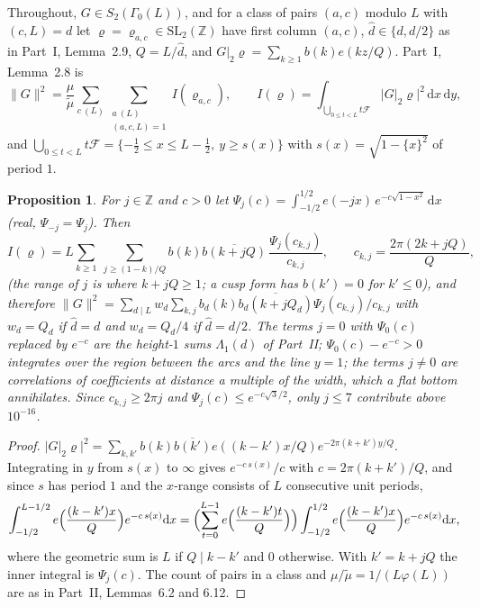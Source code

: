 \documentclass[11pt]{amsart}
\newtheorem{proposition}[theorem]{Proposition}
\theoremstyle{remark}
\newcommand{\Z}{\mathbb{Z}}
\newcommand{\dd}{\mathrm{d}}
\newcommand{\cF}{\mathcal{F}}
\begin{document}
Throughout, $G\in S_2(\Gamma_0(L))$, and for a class of pairs $(a,c)$ modulo $L$ with $(c,L)=d$ let $\varrho=\varrho_{a,c}\in\mathrm{SL}_2(\Z)$ have first column $(a,c)$, $\hat d\in\{d,d/2\}$ as in Part~I, Lemma~2.9, $Q=L/\hat d$, and $G|_2\varrho=\sum_{k\ge1}b(k)e(kz/Q)$. Part~I, Lemma~2.8 is
\begin{equation}\label{eq:W1}
\|G\|^2=\frac\mu{\tilde\mu}\sum_{c\ (L)}\sum_{\substack{a\ (L)\\(a,c,L)=1}}I(\varrho_{a,c}),\qquad I(\varrho)=\int_{\bigcup_{0\le t<L}t\cF}|G|_2\varrho|^2\,\dd x\,\dd y,
\end{equation}
and $\bigcup_{0\le t<L}t\cF=\{-\frac12\le x\le L-\frac12,\ y\ge s(x)\}$ with $s(x)=\sqrt{1-\{x\}^2}$ of period $1$.

\begin{proposition}\label{prop:scallop}
For $j\in\Z$ and $c>0$ let $\Psi_j(c)=\int_{-1/2}^{1/2}e(-jx)\,e^{-c\sqrt{1-x^2}}\,\dd x$ (real, $\Psi_{-j}=\Psi_j$). Then
\[
I(\varrho)=L\sum_{k\ge1}\ \sum_{j\ge(1-k)/Q}b(k)\overline{b(k+jQ)}\,\frac{\Psi_j(c_{k,j})}{c_{k,j}},\qquad c_{k,j}=\frac{2\pi(2k+jQ)}{Q},
\]
(the range of $j$ is where $k+jQ\ge1$; a cusp form has $b(k')=0$ for $k'\le0$), and therefore $\|G\|^2=\sum_{d\mid L}w_d\sum_{k,j}b_d(k)\overline{b_d(k+jQ_d)}\Psi_j(c_{k,j})/c_{k,j}$ with $w_d=Q_d$ if $\hat d=d$ and $w_d=Q_d/4$ if $\hat d=d/2$. The terms $j=0$ with $\Psi_0(c)$ replaced by $e^{-c}$ are the height-$1$ sums $\Lambda_1(d)$ of Part~II; $\Psi_0(c)-e^{-c}>0$ integrates over the region between the arcs and the line $y=1$; the terms $j\ne0$ are correlations of coefficients at distance a multiple of the width, which a flat bottom annihilates. Since $c_{k,j}\ge2\pi j$ and $\Psi_j(c)\le e^{-c\sqrt3/2}$, only $j\le7$ contribute above $10^{-16}$.
\end{proposition}
\begin{proof}
$|G|_2\varrho|^2=\sum_{k,k'}b(k)\overline{b(k')}e((k-k')x/Q)e^{-2\pi(k+k')y/Q}$. Integrating in $y$ from $s(x)$ to $\infty$ gives $e^{-c\,s(x)}/c$ with $c=2\pi(k+k')/Q$, and since $s$ has period $1$ and the $x$-range consists of $L$ consecutive unit periods,
\[
\int_{-1/2}^{L-1/2}e\Bigl(\frac{(k-k')x}Q\Bigr)e^{-c\,s(x)}\dd x=\Bigl(\sum_{t=0}^{L-1}e\Bigl(\frac{(k-k')t}Q\Bigr)\Bigr)\int_{-1/2}^{1/2}e\Bigl(\frac{(k-k')x}Q\Bigr)e^{-c\,s(x)}\dd x,
\]
where the geometric sum is $L$ if $Q\mid k-k'$ and $0$ otherwise. With $k'=k+jQ$ the inner integral is $\Psi_j(c)$. The count of pairs in a class and $\mu/\tilde\mu=1/(L\varphi(L))$ are as in Part~II, Lemmas~6.2 and 6.12.
\end{proof}
\end{document}
